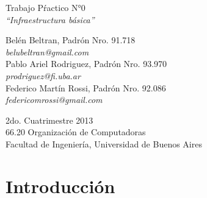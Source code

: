 \documentclass{article}
\begin{document}
\setcounter{page}{5}

\begin{titlepage}
	\vspace*{\fill}
	\begin{center}
		\huge{Trabajo Pŕactico N°0} \\
		\medskip
		\Huge \textit{``Infraestructura básica''} \\
		
		\bigskip\bigskip\bigskip\bigskip\bigskip

		\Large Belén Beltran, Padrón Nro. 91.718 \\
		\large \textit{belubeltran@gmail.com} \\ \medskip
		\Large Pablo Ariel Rodriguez, Padrón Nro. 93.970 \\
		\large \textit{prodriguez@fi.uba.ar} \\ \medskip
		\Large Federico Martín Rossi, Padrón Nro. 92.086 \\
		\large \textit{federicomrossi@gmail.com} \\

		\bigskip\bigskip\bigskip\bigskip\bigskip\bigskip\bigskip

		\large 2do. Cuatrimestre 2013 \\ \smallskip
		\large 66.20 Organización de Computadoras \\ \smallskip
		\large Facultad de Ingeniería, Universidad de Buenos Aires \\ \smallskip

		\date{}
	\end{center}
	\vspace*{\fill}
\end{titlepage}

\newpage
\newpage \textit{}
\newpage



\tableofcontents
\newpage \textit{}
\newpage
{}




\section{Introducción}
	
\end{document}
